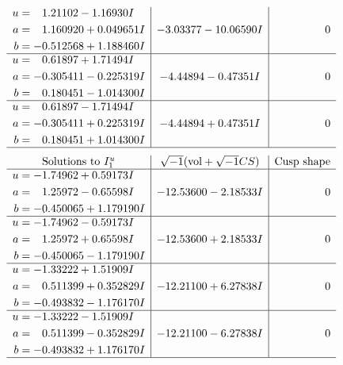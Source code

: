 \documentclass[1p]{elsarticle_modified}
\theoremstyle{definition}
\newcommand{\I}{\sqrt{-1}}
\begin{document}
$$\begin{array}{c|c|c}
\begin{aligned}
u &= \phantom{-}1.21102 - 1.16930 I \\
a &= \phantom{-}1.160920 + 0.049651 I \\
b &= -0.512568 + 1.188460 I\end{aligned}
 & -3.03377 - 10.06590 I & \phantom{-0.000000 } 0 \\ \hline\begin{aligned}
u &= \phantom{-}0.61897 + 1.71494 I \\
a &= -0.305411 - 0.225319 I \\
b &= \phantom{-}0.180451 - 1.014300 I\end{aligned}
 & -4.44894 - 0.47351 I & \phantom{-0.000000 } 0 \\ \hline\begin{aligned}
u &= \phantom{-}0.61897 - 1.71494 I \\
a &= -0.305411 + 0.225319 I \\
b &= \phantom{-}0.180451 + 1.014300 I\end{aligned}
 & -4.44894 + 0.47351 I & \phantom{-0.000000 } 0\\
 \hline 
 \end{array}$$\newpage$$\begin{array}{c|c|c}  
\text{Solutions to }I^u_{1}& \I (\text{vol} + \sqrt{-1}CS) & \text{Cusp shape}\\
 \hline 
\begin{aligned}
u &= -1.74962 + 0.59173 I \\
a &= \phantom{-}1.25972 - 0.65598 I \\
b &= -0.450065 + 1.179190 I\end{aligned}
 & -12.53600 - 2.18533 I & \phantom{-0.000000 } 0 \\ \hline\begin{aligned}
u &= -1.74962 - 0.59173 I \\
a &= \phantom{-}1.25972 + 0.65598 I \\
b &= -0.450065 - 1.179190 I\end{aligned}
 & -12.53600 + 2.18533 I & \phantom{-0.000000 } 0 \\ \hline\begin{aligned}
u &= -1.33222 + 1.51909 I \\
a &= \phantom{-}0.511399 + 0.352829 I \\
b &= -0.493832 - 1.176170 I\end{aligned}
 & -12.21100 + 6.27838 I & \phantom{-0.000000 } 0 \\ \hline\begin{aligned}
u &= -1.33222 - 1.51909 I \\
a &= \phantom{-}0.511399 - 0.352829 I \\
b &= -0.493832 + 1.176170 I\end{aligned}
 & -12.21100 - 6.27838 I & \phantom{-0.000000 } 0\\
 \hline 
 \end{array}$$\newpage\newpage\renewcommand{\arraystretch}{1}
\end{document}
